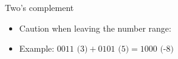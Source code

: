 \begin{vbframe}{Two's complement}
\vspace{-0.5cm}

\begin{itemize}
\item Caution when leaving the number range:
\item Example: $0011 \text{ (3)} + 0101 \text{ (5)} = 1000 \text{ (-8)}$
\end{itemize}




%
%
%

%

%
%

%


\end{vbframe}


